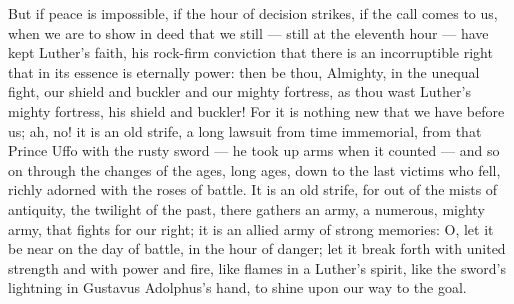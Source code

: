 \documentclass[12pt,a4paper,openany]{book}
\begin{document}
But if peace is impossible, if the hour of decision strikes,
if the call comes to us, when we are to show in deed that we
still --- still at the eleventh hour --- have kept Luther's faith,
his rock-firm conviction that there is an incorruptible right
that in its essence is eternally power: then be thou, Almighty, in
the unequal fight, our shield and buckler and our mighty fortress,
as thou wast Luther's mighty fortress, his shield and buckler!
For it is nothing new that we have before us; ah, no! it is an
old strife, a long lawsuit from time immemorial, from
that Prince Uffo with the rusty sword --- he took up
arms when it counted --- and so on through the changes of the ages, long
ages, down to the last victims who fell, richly
adorned with the roses of battle. It is an old strife,
for out of the mists of antiquity, the twilight of the past, there gathers an %
army, a numerous, mighty army, that fights for our right; it
is an allied army of strong memories: O, let it be near
on the day of battle, in the hour of danger; let it break forth with
united strength and with power and fire, like flames in a Luther's
spirit, like the sword's lightning in Gustavus Adolphus's hand, to shine
upon our way to the goal.
\end{document}

